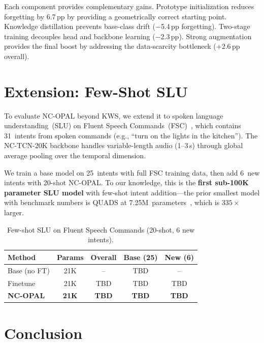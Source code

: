 \documentclass{Interspeech}
\begin{document}
Each component provides complementary gains.
Prototype initialization reduces forgetting by 6.7\,pp by providing a geometrically correct starting point.
Knowledge distillation prevents base-class drift ($-$5.4\,pp forgetting).
Two-stage training decouples head and backbone learning ($-$2.3\,pp).
Strong augmentation provides the final boost by addressing the data-scarcity bottleneck ($+$2.6\,pp overall).

\section{Extension: Few-Shot SLU}
\label{sec:slu}

To evaluate NC-OPAL beyond KWS, we extend it to spoken language understanding~(SLU) on Fluent Speech Commands~(FSC)~\cite{lugosch2019fsc}, which contains 31~intents from spoken commands (e.g., ``turn on the lights in the kitchen'').
The NC-TCN-20K backbone handles variable-length audio (1--3\,s) through global average pooling over the temporal dimension.

We train a base model on 25~intents with full FSC training data, then add 6~new intents with 20-shot NC-OPAL.
To our knowledge, this is the \textbf{first sub-100K parameter SLU model} with few-shot intent addition---the prior smallest model with benchmark numbers is QUADS at 7.25M~parameters~\cite{quads2025}, which is $335{\times}$ larger.

\begin{table}[t]
\centering
\caption{Few-shot SLU on Fluent Speech Commands (20-shot, 6 new intents).}
\label{tab:slu}
\setlength{\tabcolsep}{5pt}
\begin{tabular}{@{}lcccc@{}}
\toprule
Method & Params & Overall & Base (25) & New (6) \\
\midrule
Base (no FT) & 21K & -- & TBD & -- \\
Finetune     & 21K & TBD & TBD & TBD \\
\textbf{NC-OPAL} & \textbf{21K} & \textbf{TBD} & \textbf{TBD} & \textbf{TBD} \\
\bottomrule
\end{tabular}
\end{table}

\section{Conclusion}
\end{document}
